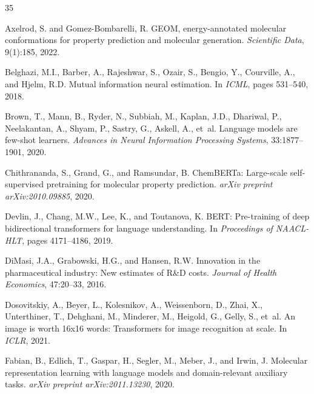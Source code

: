 \documentclass[11pt]{article}
\begin{document}

\begin{thebibliography}{35}

Axelrod, S. and Gomez-Bombarelli, R.
\newblock GEOM, energy-annotated molecular conformations for property prediction and molecular generation.
\newblock \emph{Scientific Data}, 9(1):185, 2022.

Belghazi, M.I., Barber, A., Rajeshwar, S., Ozair, S., Bengio, Y., Courville, A., and Hjelm, R.D.
\newblock Mutual information neural estimation.
\newblock In \emph{ICML}, pages 531--540, 2018.

Brown, T., Mann, B., Ryder, N., Subbiah, M., Kaplan, J.D., Dhariwal, P., Neelakantan, A., Shyam, P., Sastry, G., Askell, A., et~al.
\newblock Language models are few-shot learners.
\newblock \emph{Advances in Neural Information Processing Systems}, 33:1877--1901, 2020.

Chithrananda, S., Grand, G., and Ramsundar, B.
\newblock ChemBERTa: Large-scale self-supervised pretraining for molecular property prediction.
\newblock \emph{arXiv preprint arXiv:2010.09885}, 2020.

Devlin, J., Chang, M.W., Lee, K., and Toutanova, K.
\newblock BERT: Pre-training of deep bidirectional transformers for language understanding.
\newblock In \emph{Proceedings of NAACL-HLT}, pages 4171--4186, 2019.

DiMasi, J.A., Grabowski, H.G., and Hansen, R.W.
\newblock Innovation in the pharmaceutical industry: New estimates of R\&D costs.
\newblock \emph{Journal of Health Economics}, 47:20--33, 2016.

Dosovitskiy, A., Beyer, L., Kolesnikov, A., Weissenborn, D., Zhai, X., Unterthiner, T., Dehghani, M., Minderer, M., Heigold, G., Gelly, S., et~al.
\newblock An image is worth 16x16 words: Transformers for image recognition at scale.
\newblock In \emph{ICLR}, 2021.

Fabian, B., Edlich, T., Gaspar, H., Segler, M., Meber, J., and Irwin, J.
\newblock Molecular representation learning with language models and domain-relevant auxiliary tasks.
\newblock \emph{arXiv preprint arXiv:2011.13230}, 2020.


\end{thebibliography}
\end{document}
